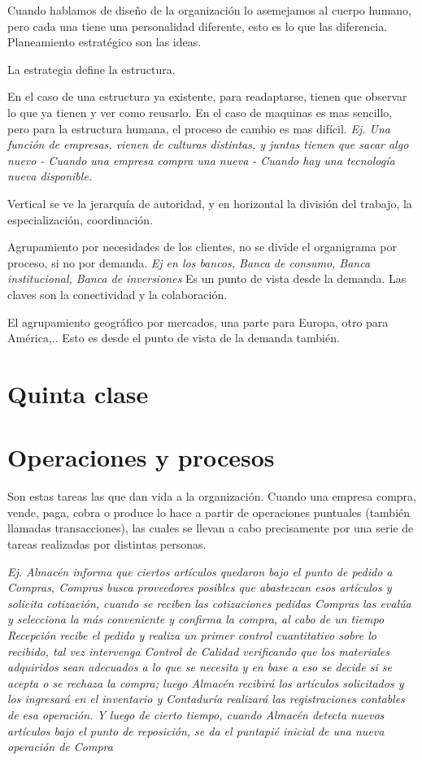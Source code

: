\documentclass[titlepage,a4paper]{article}
\begin{document}
Cuando hablamos de diseño de la organización lo asemejamos al cuerpo humano, pero cada una tiene una personalidad diferente, esto es lo que las diferencia.
Planeamiento estratégico son las ideas.

La estrategia define la estructura.

En el caso de una estructura ya existente, para readaptarse, tienen que observar lo que ya tienen y ver como reusarlo. En el caso de maquinas es mas sencillo, pero para la estructura humana, el proceso de cambio es mas difícil. \textit{Ej. Una función de empresas, vienen de culturas distintas, y juntas tienen que sacar algo nuevo - Cuando una empresa compra una nueva - Cuando hay una tecnología nueva disponible.}

Vertical se ve la jerarquía de autoridad, y en horizontal la división del trabajo, la especialización, coordinación.

Agrupamiento por necesidades de los clientes, no se divide el organigrama por proceso, si no por demanda. \textit{Ej en los bancos, Banca de consumo, Banca institucional, Banca de inversiones} Es un punto de vista desde la demanda. Las claves son la conectividad y la colaboración.

El agrupamiento geográfico por mercados, una parte para Europa, otro para América,.. Esto es desde el punto de vista de la demanda también. 

\newpage
\section*{Quinta clase}
\section{Operaciones y procesos}
Son estas tareas las que dan vida a la organización. Cuando una empresa compra, vende, paga, cobra o produce lo hace a partir de operaciones puntuales (también llamadas transacciones), las cuales se llevan a cabo precisamente por una serie de tareas realizadas por distintas personas.

\textit{ Ej.
Almacén informa que ciertos artículos quedaron bajo el punto de pedido a Compras, Compras busca
proveedores posibles que abastezcan esos artículos y solicita cotización, cuando se reciben las
cotizaciones pedidas Compras las evalúa y selecciona la más conveniente y confirma la compra, al
cabo de un tiempo Recepción recibe el pedido y realiza un primer control cuantitativo sobre lo
recibido, tal vez intervenga Control de Calidad verificando que los materiales adquiridos sean
adecuados a lo que se necesita y en base a eso se decide si se acepta o se rechaza la compra; luego
Almacén recibirá los artículos solicitados y los ingresará en el inventario y Contaduría realizará las
registraciones contables de esa operación. Y luego de cierto tiempo, cuando Almacén detecta nuevos
artículos bajo el punto de reposición, se da el puntapié inicial de una nueva operación de Compra
}
\end{document}

